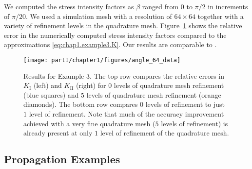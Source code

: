 We computed the stress intensity factors as $\beta$ ranged from $0$ to $\pi/2$ in increments of $\pi/20$. We used a simulation mesh with a resolution of $64 \times 64$ together with a variety of refinement levels in the quadrature mesh. Figure~\ref{fig:chap1.example3.results} shows the relative error in the numerically computed stress intensity factors compared to the approximations \eqref{eq:chap1.example3.K}. Our results are comparable to \cite{Moes99}.

\setlength{\figurewidth}{\textwidth}
\begin{figure}[htbp]
\centering
\texttt{[image: partI/chapter1/figures/angle\_64\_data]}
\caption{Results for Example 3. The top row compares the relative errors in $K_{\text{I}}$ (left) and $K_{\text{II}}$ (right) for $0$ levels of quadrature mesh refinement (blue squares) and $5$ levels of quadrature mesh refinement (orange diamonds). The bottom row compares $0$ levels of refinement to just $1$ level of refinement. Note that much of the accuracy improvement achieved with a very fine quadrature mesh ($5$ levels of refinement) is already present at only $1$ level of refinement of the quadrature mesh.}
\label{fig:chap1.example3.results}
\end{figure}

\subsection{Propagation Examples}

